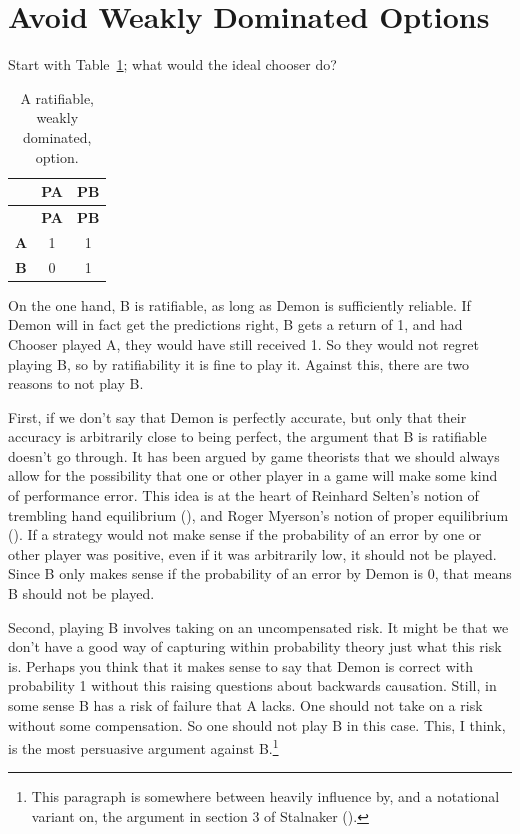 \documentclass[
  12pt,
  letterpaper,
  DIV=11,
  numbers=noendperiod]{scrreprt}
\begin{document}
\section{Avoid Weakly Dominated Options}\label{sec-weak-avoid}

Start with Table~\ref{tbl-first-wd}; what would the ideal chooser do?

\begin{longtable}[]{@{}ccc@{}}
\caption{A ratifiable, weakly dominated,
option.}\label{tbl-first-wd}\tabularnewline
\toprule\noalign{}
& \textbf{PA} & \textbf{PB} \\
\midrule\noalign{}
\endfirsthead
\toprule\noalign{}
& \textbf{PA} & \textbf{PB} \\
\midrule\noalign{}
\endhead
\bottomrule\noalign{}
\endlastfoot
\textbf{A} & 1 & 1 \\
\textbf{B} & 0 & 1 \\
\end{longtable}

On the one hand, B is ratifiable, as long as Demon is sufficiently
reliable. If Demon will in fact get the predictions right, B gets a
return of 1, and had Chooser played A, they would have still received 1.
So they would not regret playing B, so by ratifiability it is fine to
play it. Against this, there are two reasons to not play B.

First, if we don't say that Demon is perfectly accurate, but only that
their accuracy is arbitrarily close to being perfect, the argument that
B is ratifiable doesn't go through. It has been argued by game theorists
that we should always allow for the possibility that one or other player
in a game will make some kind of performance error. This idea is at the
heart of Reinhard Selten's notion of trembling hand equilibrium
(), and Roger Myerson's notion of
proper equilibrium (). If a
strategy would not make sense if the probability of an error by one or
other player was positive, even if it was arbitrarily low, it should not
be played. Since B only makes sense if the probability of an error by
Demon is 0, that means B should not be played.

Second, playing B involves taking on an uncompensated risk. It might be
that we don't have a good way of capturing within probability theory
just what this risk is. Perhaps you think that it makes sense to say
that Demon is correct with probability 1 without this raising questions
about backwards causation. Still, in some sense B has a risk of failure
that A lacks. One should not take on a risk without some compensation.
So one should not play B in this case. This, I think, is the most
persuasive argument against B.\footnote{This paragraph is somewhere
  between heavily influence by, and a notational variant on, the
  argument in section 3 of Stalnaker
  ().}
\end{document}
